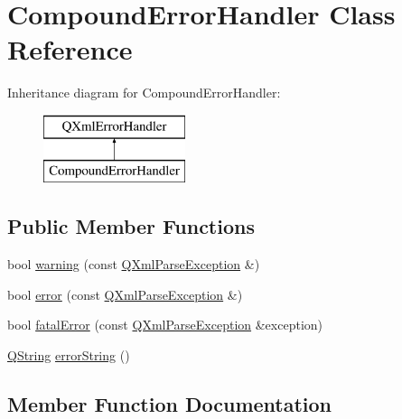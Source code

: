 \hypertarget{class_compound_error_handler}{}\section{Compound\+Error\+Handler Class Reference}
\label{class_compound_error_handler}
Inheritance diagram for Compound\+Error\+Handler\+:\begin{figure}[H]
\begin{center}
\leavevmode
\includegraphics[height=2.000000cm]{class_compound_error_handler}
\end{center}
\end{figure}
\subsection*{Public Member Functions}
\begin{DoxyCompactItemize}
\item 
bool \mbox{\hyperlink{class_compound_error_handler_a80ccb953cac3ead66ae9c8892d8e3c03}{warning}} (const \mbox{\hyperlink{class_q_xml_parse_exception}{Q\+Xml\+Parse\+Exception}} \&)
\item 
bool \mbox{\hyperlink{class_compound_error_handler_a6b83c3c1e17622a7f33a977fc8f146c1}{error}} (const \mbox{\hyperlink{class_q_xml_parse_exception}{Q\+Xml\+Parse\+Exception}} \&)
\item 
bool \mbox{\hyperlink{class_compound_error_handler_a64adb9938c3f3e70a76cc4a224f0d093}{fatal\+Error}} (const \mbox{\hyperlink{class_q_xml_parse_exception}{Q\+Xml\+Parse\+Exception}} \&exception)
\item 
\mbox{\hyperlink{class_q_string}{Q\+String}} \mbox{\hyperlink{class_compound_error_handler_aceb61310e8c5649d6390a8dff0992caf}{error\+String}} ()
\end{DoxyCompactItemize}


\subsection{Member Function Documentation}
\mbox{\label{class_compound_error_handler_a6b83c3c1e17622a7f33a977fc8f146c1}} 
